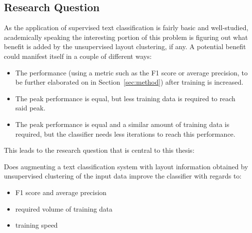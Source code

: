 \subsection{Research Question}
As the application of supervised text classification is fairly basic and
well-studied, academically speaking the interesting portion of this problem is
figuring out what benefit is added by the unsupervised layout clustering, if
any. A potential benefit could manifest itself in a couple of different ways:
\begin{itemize}
\item The performance (using a metric such as the F1 score or average
  precision, to be further elaborated on in Section~\ref{sec:method}) after
  training is increased.
\item The peak performance is equal, but less training data is required to reach
  said peak.
\item The peak performance is equal and a similar amount of training data is
  required, but the classifier needs less iterations to reach this performance.
\end{itemize}
This leads to the research question that is central to this thesis:
\begin{researchquestion}
  Does augmenting a text classification system with layout information obtained
  by unsupervised clustering of the input data improve the classifier with
  regards to:
  \begin{itemize}
  \item F1 score and average precision
  \item required volume of training data
  \item training speed
  \end{itemize}
\end{researchquestion}

